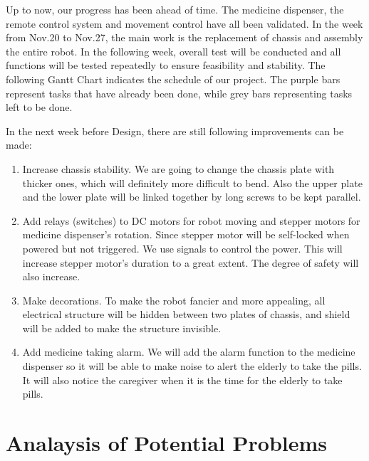\documentclass[12pt]{article}
\begin{document}
\par Up to now, our progress has been ahead of time. The medicine dispenser, the remote control system and movement control have all been validated. In the week from Nov.20 to Nov.27, the main work is the replacement of chassis and assembly the entire robot. In the following week, overall test will be conducted and all functions will be tested repeatedly to ensure feasibility and stability. The following Gantt Chart indicates the schedule of our project. The purple bars represent tasks that have already been done, while grey bars representing tasks left to be done.
\par In the next week before Design, there are still following improvements can be made:
\begin{enumerate}
\item Increase chassis stability. We are going to change the chassis plate with thicker ones, which will definitely more difficult to bend. Also the upper plate and the lower plate will be linked together by long screws to be kept parallel.
\item Add relays (switches) to DC motors for robot moving and stepper motors for medicine dispenser’s rotation. Since stepper motor will be self-locked when powered but not triggered. We use signals to control the power. This will increase stepper motor’s duration to a great extent. The degree of safety will also increase.
\item Make decorations. To make the robot fancier and more appealing, all electrical
 structure will be hidden between two plates of chassis, and shield will be added to make the structure invisible.
\item Add medicine taking alarm. We will add the alarm function to the medicine dispenser so it will be able to make noise to alert the elderly to take the pills. It will also notice the caregiver when it is the time for the elderly to take pills.
\end{enumerate}

\section{Analaysis of Potential Problems}
\end{document}

